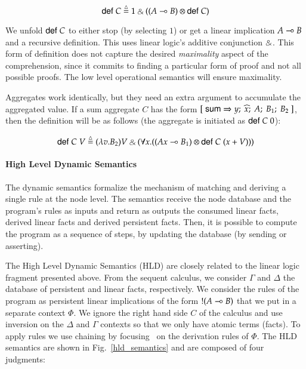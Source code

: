 \[
\compr{C} \defeq 1 \with ((A \lolli B) \otimes \compr{C})
\]

We unfold $\mathsf{def} \; C$ to either stop (by selecting $1$) or get a linear implication $A \multimap B$
and a recursive definition. This uses linear logic's additive conjunction $\mathbin{\binampersand}$.
This form of definition does not capture the desired \emph{maximality} aspect of the comprehension,
since it commits to finding a particular form of proof and not all possible proofs. The low level
operational semantics will ensure maximality.

Aggregates work identically, but they need an extra argument to accumulate the aggregated value. If a sum aggregate $C$ has the form $[\;\mathsf{sum} \Rightarrow y; \; \widehat{x}; \; A; \; B_1; \; B_2 \;]$, then the definition will be as follows (the aggregate is initiated as $\mathsf{def} \; C \; 0$):

\[
\compr{C} \; V \defeq (\lambda v. B_2)V \with (\forall x. ((Ax \lolli B_1) \otimes \compr{C} \; (x + V)))
\]

\paragraph{High Level Dynamic Semantics}

The dynamic semantics formalize the mechanism of matching and deriving a single rule at the node level. The semantics receive the node database and the program's rules as inputs and return as outputs the consumed linear facts, derived linear facts and derived persistent facts. Then, it is possible
to compute the program as a sequence of steps, by updating the database (by sending or asserting).

The High Level Dynamic Semantics (HLD) are closely related to the linear logic fragment presented above.
From the sequent calculus, we consider $\Gamma$ and $\Delta$ the database of persistent and linear facts, respectively.
We consider the rules of the program as persistent linear implications of the form ${!} (A \multimap B)$ that we put in a separate context $\Phi$.
We ignore the right hand side $C$ of the calculus and use inversion on the $\Delta$ and $\Gamma$ contexts so that we only have atomic terms (facts). To apply rules
we use chaining by focusing~\cite{Andreoli92logicprogramming} on the derivation rules of $\Phi$.
The HLD semantics are shown in Fig.~\ref{hld_semantics} and are composed of four judgments:

